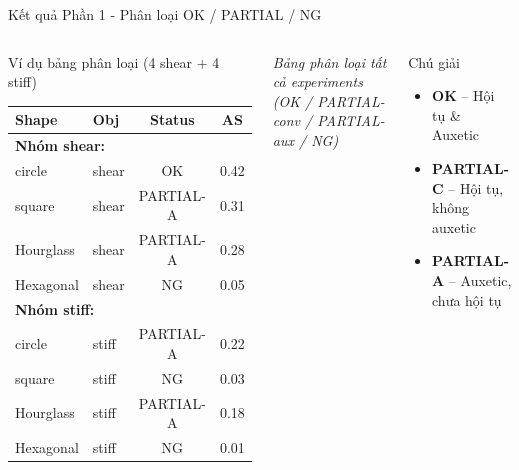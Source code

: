 \documentclass[aspectratio=169,11pt]{beamer}
\begin{document}
\begin{frame}{Kết quả Phần 1 - Phân loại OK / PARTIAL / NG}
  \begin{columns}[T, onlytextwidth]
      \begin{block}{Ví dụ bảng phân loại (4 shear + 4 stiff)}
        \footnotesize
        \begin{tabular}{llcc}
          \toprule
          Shape & Obj & Status & AS \\
          \midrule
          \multicolumn{4}{l}{\textbf{Nhóm shear:}} \\
          circle & shear & \textcolor{okgreen}{OK} & 0.42 \\
          square & shear & \textcolor{partialyellow!80!black}{PARTIAL-A} & 0.31 \\
          Hourglass & shear & \textcolor{partialyellow!80!black}{PARTIAL-A} & 0.28 \\
          Hexagonal & shear & \textcolor{ngred}{NG} & 0.05 \\
          \midrule
          \multicolumn{4}{l}{\textbf{Nhóm stiff:}} \\
          circle & stiff & \textcolor{partialyellow!80!black}{PARTIAL-A} & 0.22 \\
          square & stiff & \textcolor{ngred}{NG} & 0.03 \\
          Hourglass & stiff & \textcolor{partialyellow!80!black}{PARTIAL-A} & 0.18 \\
          Hexagonal & stiff & \textcolor{ngred}{NG} & 0.01 \\
          \bottomrule
        \end{tabular}
      \end{block}
      \vspace{0.2cm}
      {\footnotesize\textit{Bảng phân loại tất cả experiments\\
       (OK / PARTIAL-conv / PARTIAL-aux / NG)}}
      \begin{block}{Chú giải}
        \small
        \begin{itemize}
          \item \textcolor{okgreen}{\textbf{OK}} -- Hội tụ \& Auxetic
          \item \textcolor{partialyellow!80!black}{\textbf{PARTIAL-C}}
                -- Hội tụ, không auxetic
          \item \textcolor{partialyellow!80!black}{\textbf{PARTIAL-A}}
                -- Auxetic, chưa hội tụ

\end{itemize}
\end{block}
\end{columns}
\end{frame}
\end{document}
